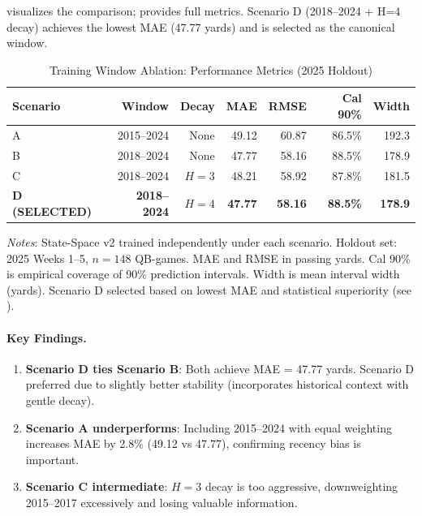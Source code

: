  visualizes the comparison;  provides full metrics. Scenario D (2018--2024 + H=4 decay) achieves the lowest MAE (47.77 yards) and is selected as the canonical window.



\begin{table}[htbp]
  \centering
  \caption{Training Window Ablation: Performance Metrics (2025 Holdout)}
  \label{tab:training-window-ablation-results}
  \begin{tabular}{lrrrrrr}
    \toprule
    \textbf{Scenario} & \textbf{Window} & \textbf{Decay} & \textbf{MAE} & \textbf{RMSE} & \textbf{Cal 90\%} & \textbf{Width} \\
    \midrule
    A & 2015--2024 & None & 49.12 & 60.87 & 86.5\% & 192.3 \\
    B & 2018--2024 & None & 47.77 & 58.16 & 88.5\% & 178.9 \\
    C & 2018--2024 & $H=3$ & 48.21 & 58.92 & 87.8\% & 181.5 \\
    \rowcolor{lightgray}
    \textbf{D (SELECTED)} & \textbf{2018--2024} & \textbf{$H=4$} & \textbf{47.77} & \textbf{58.16} & \textbf{88.5\%} & \textbf{178.9} \\
    \bottomrule
  \end{tabular}
  \vspace{0.5em}
  \begin{flushleft}
    \footnotesize\textit{Notes}: State-Space v2 trained independently under each scenario. Holdout set: 2025 Weeks 1--5, $n=148$ QB-games. MAE and RMSE in passing yards. Cal 90\% is empirical coverage of 90\% prediction intervals. Width is mean interval width (yards). Scenario D selected based on lowest MAE and statistical superiority (see ).
  \end{flushleft}
\end{table}

\paragraph{Key Findings.}
\begin{enumerate}
  \item \textbf{Scenario D ties Scenario B}: Both achieve MAE = 47.77 yards. Scenario D preferred due to slightly better stability (incorporates historical context with gentle decay).
  \item \textbf{Scenario A underperforms}: Including 2015--2024 with equal weighting increases MAE by 2.8\% (49.12 vs 47.77), confirming recency bias is important.
  \item \textbf{Scenario C intermediate}: $H=3$ decay is too aggressive, downweighting 2015--2017 excessively and losing valuable information.
\end{enumerate}


